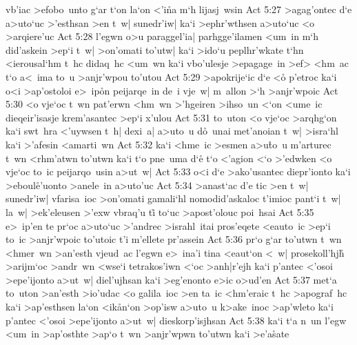 vb'iac
>efobo~unto
g`ar
t`on
la`on
<'i\r{n}a
m`h
lijasj~wsin\bibvsend
\vs Act 5:27
>agag'ontec
d`e
a>uto`uc
>'esthsan
>en
t~w|
sunedr'iw|
ka`i
>ephr'wthsen
a>uto`uc
<o
>arqiere'uc\bibvsend
\vs Act 5:28
l'egwn
o>u
paraggel'ia|
parhgge'ilamen
<um~in
m`h
did'askein
>ep`i
t~w|
>on'omati
to'utw|
ka`i
>ido`u
peplhr'wkate
t`hn
<ierousal`hm
t~hc
didaq~hc
<um~wn
ka`i
vbo'ulesje
>epagage~in
>ef>
<hm~ac
t`o
a<~ima
to~u
>anjr'wpou
to'utou\bibvsend
\vs Act 5:29
>apokrije`ic
d`e
<o\r{}
p'etroc
ka`i
o<i
>ap'ostoloi
e>~ip\r{o}n
peijarqe~in
de~i
vje~w|
m~allon
>`h
>anjr'wpoic\bibvsend
\vs Act 5:30
<o
vje`oc
t~wn
pat'erwn
<hm~wn
>'hgeiren
>ihso~un
<`on
<ume~ic
dieqeir'isasje
krem'asantec
>ep`i
x'ulou\bibvsend
\vs Act 5:31
to~uton
<o
vje`oc
>arqhg`on
ka`i
swt~hra
<'uywsen
t~h|
dexi~a|
a>uto~u
d\r{o}~unai
met'anoian
t~w|
>isra`hl
ka`i
>'afesin
<amarti~wn\bibvsend
\vs Act 5:32
ka`i
<hme~ic
>esmen
a>u\r{t}o~u
m'arturec
t~wn
<rhm'atwn
to'utwn
ka`i
t`o
pne~uma
d`e\r{}
t`o
<'agion
<`o
>'edwken
<o
vje`oc
to~ic
peijarqo~usin
a>ut~w|\bibvsend
\vs Act 5:33
o<i
d`e
>ako'usantec
diepr'ionto
ka`i
>eboul\r{e}'uonto
>anele~in
a>uto'uc\bibvsend
\vs Act 5:34
>anast`ac
d'e
tic
>en
t~w|
sunedr'iw|
vfarisa~ioc
>on'omati
gamali`hl
nomodid'askaloc
t'imioc
pant`i
t~w|
la~w|
>ek'eleusen
>'exw
vbraq'u
ti\r{}
to`uc
>apost'olouc
poi~hsai\bibvsend
\vs Act 5:35
e>~ip'en
te
pr`oc
a>uto`uc
>'andrec
>israhl~itai
pros'eqete
<eauto~ic
>ep`i
to~ic
>anjr'wpoic
to'utoic
t'i
m'ellete
pr'assein\bibvsend
\vs Act 5:36
pr`o
g`ar
to'utwn
t~wn
<hmer~wn
>an'esth
vjeud~ac
l'egwn
e>~ina'i
tina
<eaut`on
<~w|
prosekoll'hjh\r{}
>arijm`oc
>andr~wn
<wse`i
tetrakos'iwn
<`oc
>anh|r'ejh
ka`i
p'antec
<'osoi
>epe'ijonto
a>ut~w|
diel'ujhsan
ka`i
>eg'enonto
e>ic
o>ud'en\bibvsend
\vs Act 5:37
met`a
to~uton
>an'esth
>io'udac
<o
galila~ioc
>en
ta~ic
<hm'eraic
t~hc
>apograf~hc
ka`i
>ap'esthsen
la`on
<ik\r{a}n`on
>op'isw
a>uto~u
k>ake~inoc
>ap'wleto
ka`i
p'antec
<'osoi
>epe'ijonto
a>ut~w|
dieskorp'isjhsan\bibvsend
\vs Act 5:38
ka`i
t`a
n~un
l'egw
<um~in
>ap'osthte
>ap`o
t~wn
>anjr'wpwn
to'utwn
ka`i
>e'a\r{s}ate
